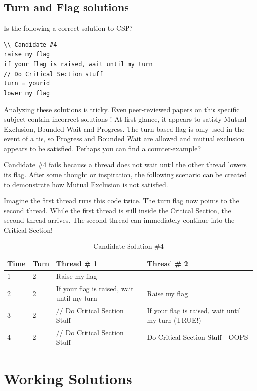 \subsection{Turn and Flag solutions}

Is the following a correct solution to CSP?

\begin{lstlisting}
\\ Candidate #4
raise my flag
if your flag is raised, wait until my turn
// Do Critical Section stuff
turn = yourid
lower my flag
\end{lstlisting}

Analyzing these solutions is tricky.
Even peer-reviewed papers on this specific subject contain incorrect solutions \cite{Hyman:1966:CPC:365153.365167}!
At first glance, it appears to satisfy Mutual Exclusion, Bounded Wait and Progress.
The turn-based flag is only used in the event of a tie, so Progress and Bounded Wait are allowed and mutual exclusion appears to be satisfied.
Perhaps you can find a counter-example?

Candidate \#4 fails because a thread does not wait until the other thread lowers its flag.
After some thought or inspiration, the following scenario can be created to demonstrate how Mutual Exclusion is not satisfied.

Imagine the first thread runs this code twice.
The turn flag now points to the second thread.
While the first thread is still inside the Critical Section, the second thread arrives.
The second thread can immediately continue into the Critical Section!

\begin{table}[h]
  \centering
\caption{Candidate Solution \#4}
\begin{tabular}{|l|l|l|l|}
Time & Turn & Thread \# 1 & Thread \# 2 \\ \hline
1 & 2 & Raise my flag & \\
2 & 2 & If your flag is raised, wait until my turn & Raise my flag \\
3 & 2 & // Do Critical Section Stuff & If your flag is raised, wait until my turn (TRUE!) \\
4 & 2 & // Do Critical Section Stuff & Do Critical Section Stuff - OOPS \\
\end{tabular}
\end{table}

\section{Working Solutions}

